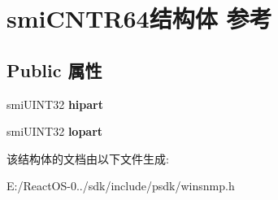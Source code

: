 \hypertarget{structsmi_c_n_t_r64}{}\section{smi\+C\+N\+T\+R64结构体 参考}
\label{structsmi_c_n_t_r64}
\subsection*{Public 属性}
\begin{DoxyCompactItemize}
\item 
\mbox{\label{structsmi_c_n_t_r64_a674364412076a862e120e5383f8fff31}} 
smi\+U\+I\+N\+T32 {\bfseries hipart}
\item 
\mbox{\label{structsmi_c_n_t_r64_a6eb98a3adc8295ef8c8ba647c7b26cc4}} 
smi\+U\+I\+N\+T32 {\bfseries lopart}
\end{DoxyCompactItemize}


该结构体的文档由以下文件生成\+:\begin{DoxyCompactItemize}
\item 
E\+:/\+React\+O\+S-\/0../sdk/include/psdk/winsnmp.\+h\end{DoxyCompactItemize}
